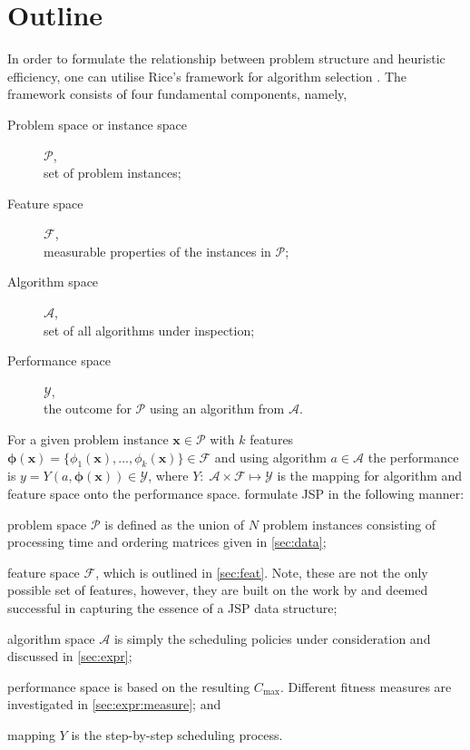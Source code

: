 \documentclass[graybox]{svmult}
\renewcommand{\vec}[1]{\mathbf{#1}}
\newcommand{\vphi}{{\boldsymbol{\phi}}}
\begin{document}
\section{Outline}
In order to formulate the relationship between problem structure and heuristic 
efficiency, one can utilise Rice's framework for algorithm selection  
\cite{Rice76}. The framework consists of four fundamental components, namely,
\begin{description}
	\item[Problem space or instance space] $\mathcal{P}$, \hfill\\
	set of problem instances; 
	\item[Feature space] $\mathcal{F}$, \hfill\\
	measurable properties of the instances in $\mathcal{P}$;
	\item[Algorithm space] $\mathcal{A}$, \hfill\\
	set of all algorithms under inspection;
	\item[Performance space] $\mathcal{Y}$, \hfill\\
	the outcome for $\mathcal{P}$ using an algorithm from $\mathcal{A}$.
\end{description}
For a given problem instance $\vec{x}\in\mathcal{P}$ with $k$ features 
$\vphi(\vec{x})=\{\phi_1(\vec{x}),...,\phi_k( \vec{x})\}\in\mathcal{F}$ and 
using algorithm $a\in\mathcal{A}$ the performance is 
$y=Y(a,\vphi(\vec{x}))\in\mathcal{Y}$, where $Y:\;\mathcal{A}\times\mathcal{F} 
\mapsto \mathcal{Y}$ is the mapping for algorithm and feature space onto the 
performance space. 
\cite{SmithMilesLion3,SmithMilesLion5,InRu12} formulate JSP in the following 
manner: 
\begin{inparaenum} 
	\item problem space $\mathcal{P}$ is defined as the union of $N$ 
	problem     
	instances consisting of processing time and ordering matrices given in     
	\cref{sec:data}; 
	\item feature space $\mathcal{F}$, which is outlined in \cref{sec:feat}. 
	Note, these are not the only possible set of features, however, they are 
	built 
	on the work by \cite{InRu11a,SmithMilesLion3} and deemed successful in 
	capturing the essence of a JSP data structure;
	\item algorithm space $\mathcal{A}$ is simply the scheduling policies under 
	consideration and discussed in \cref{sec:expr};
	\item performance space is based on the resulting $C_{\max}$. Different 
	fitness 
	measures are investigated in \cref{sec:expr:measure};
	and \item mapping $Y$ is the step-by-step scheduling process. 
\end{inparaenum}
\end{document}
